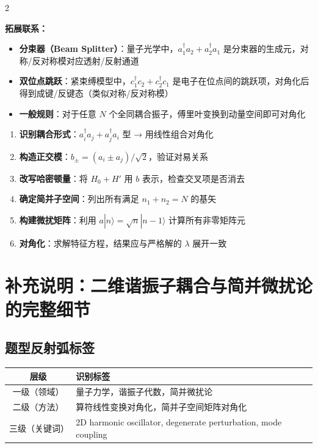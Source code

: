 \begin{multicols}{2}
\begin{insightbox}[举一反三与物理直觉]
\textbf{拓展联系：}
\begin{itemize}[nosep]
    \item \textbf{分束器（Beam Splitter）}：量子光学中，$a_1^\dagger a_2 + a_2^\dagger a_1$ 是分束器的生成元，对称/反对称模对应透射/反射通道
    \item \textbf{双位点跳跃}：紧束缚模型中，$c_1^\dagger c_2 + c_2^\dagger c_1$ 是电子在位点间的跳跃项，对角化后得到成键/反键态（类似对称/反对称模）
    \item \textbf{一般规则}：对于任意 $N$ 个全同耦合振子，傅里叶变换到动量空间即可对角化
\end{itemize}
\end{insightbox}

\begin{thinkbox}
\begin{enumerate}
    \item \textbf{识别耦合形式}：$a_i^\dagger a_j + a_j^\dagger a_i$ 型 → 用线性组合对角化
    \item \textbf{构造正交模}：$b_{\pm} = (a_i \pm a_j)/\sqrt{2}$，验证对易关系
    \item \textbf{改写哈密顿量}：将 $H_0 + H'$ 用 $b$ 表示，检查交叉项是否消去
    \item \textbf{确定简并子空间}：列出所有满足 $n_1 + n_2 = N$ 的基矢
    \item \textbf{构建微扰矩阵}：利用 $a|n\rangle = \sqrt{n}|n-1\rangle$ 计算所有非零矩阵元
    \item \textbf{对角化}：求解特征方程，结果应与严格解的 $\lambda$ 展开一致
\end{enumerate}
\end{thinkbox}

\end{multicols}

\newpage
\section[【补】二维谐振子]{补充说明：二维谐振子耦合与简并微扰论的完整细节}

\subsection{题型反射弧标签}

\begin{center}
\begin{tabular}{|c|l|}
\hline
\textbf{层级} & \textbf{识别标签} \\
\hline
一级（领域） & 量子力学，谐振子代数，简并微扰论 \\
二级（方法） & 算符线性变换对角化，简并子空间矩阵对角化 \\
三级（关键词） & 2D harmonic oscillator, degenerate perturbation, mode coupling \\
\hline
\end{tabular}
\end{center}

